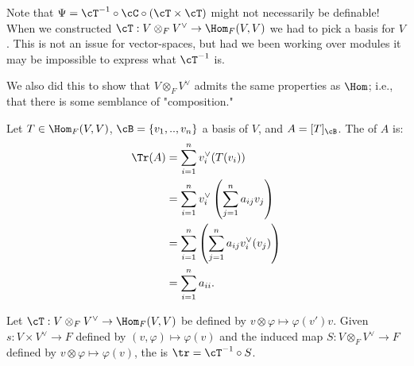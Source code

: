         \begin{remark}
            Note that $\Psi = \cT^{-1} \circ \cC \circ (\cT \times \cT)$ might not necessarily be definable! When we constructed $\cT:V \otimes_F V^\vee \rightarrow \Hom_F(V,V)$ we had to pick a basis for $V$. This is not an issue for vector-spaces, but had we been working over modules it may be impossible to express what $\cT^{-1}$ is.
        \end{remark}

        \begin{remark}
            We also did this to show that $V \otimes_F V^\vee$ admits the same properties as $\Hom$; i.e., that there is some semblance of "composition."
        \end{remark}

    \begin{definition}
        Let $T \in \Hom_F(V,V)$, $\cB = \{v_1,..,v_n\}$ a basis of $V$, and $A = [T]_\cB$. The  of $A$ is:
            \begin{equation*}
            \begin{split}
                \Tr(A) 
                &= \sum_{i = 1}^n v_i^\vee(T(v_i)) \\
                & = \sum_{i = 1}^n v_i^\vee \left(\sum_{j = 1}^n a_{ij}v_j\right) \\
                & = \sum_{i = 1}^n \left(\sum_{j = 1}^n a_{ij}v_i^\vee (v_j)\right) \\
                & = \sum_{i = 1}^n a_{ii}.
            \end{split}
            \end{equation*}
    \end{definition}

    \begin{definition}
        Let $\cT:V \otimes_F V^\vee \rightarrow \Hom_F(V,V)$ be defined by $v \otimes \varphi \mapsto \varphi(v')v$. Given $s: V \times V^\vee \rightarrow F$ defined by $(v,\varphi) \mapsto \varphi(v)$ and the induced map $S:V \otimes_F V^\vee \rightarrow F$ defined by $v \otimes \varphi \mapsto \varphi(v)$, the  is $\tr = \cT^{-1} \circ S$.
            \begin{center}
            \end{center}
    \end{definition}

